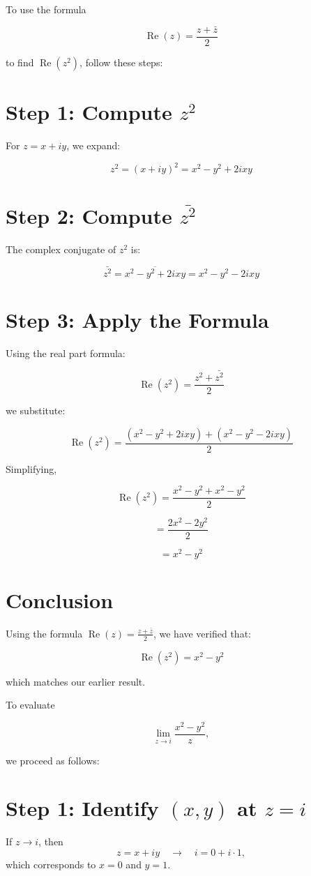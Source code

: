 \documentclass[12pt]{article}
\theoremstyle{definition} %
\theoremstyle{plain} %
\begin{document}
    To use the formula 

\[
\operatorname{Re}(z) = \frac{z + \bar{z}}{2}
\]

to find \( \operatorname{Re}(z^2) \), follow these steps:

\section*{Step 1: Compute \( z^2 \)}
For \( z = x + iy \), we expand:

\[
z^2 = (x + iy)^2 = x^2 - y^2 + 2ixy
\]

\section*{Step 2: Compute \( \bar{z^2} \)}
The complex conjugate of \( z^2 \) is:

\[
\bar{z^2} = \overline{x^2 - y^2 + 2ixy} = x^2 - y^2 - 2ixy
\]

\section*{Step 3: Apply the Formula}
Using the real part formula:

\[
\operatorname{Re}(z^2) = \frac{z^2 + \bar{z^2}}{2}
\]

we substitute:

\[
\operatorname{Re}(z^2) = \frac{(x^2 - y^2 + 2ixy) + (x^2 - y^2 - 2ixy)}{2}
\]

Simplifying,

\[
\operatorname{Re}(z^2) = \frac{x^2 - y^2 + x^2 - y^2}{2}
\]

\[
= \frac{2x^2 - 2y^2}{2}
\]

\[
= x^2 - y^2
\]

\section*{Conclusion}
Using the formula \( \operatorname{Re}(z) = \frac{z + \bar{z}}{2} \), we have verified that:

\[
\operatorname{Re}(z^2) = x^2 - y^2
\]

which matches our earlier result.

To evaluate

\[
\lim_{z \to i} \frac{x^2 - y^2}{z},
\]

we proceed as follows:

\section*{Step 1: Identify \((x, y)\) at \(z = i\)}
If \(z \to i\), then 
\[
z = x + i y \quad \longrightarrow \quad i = 0 + i \cdot 1,
\]
which corresponds to \(x = 0\) and \(y = 1\).
\end{document}
